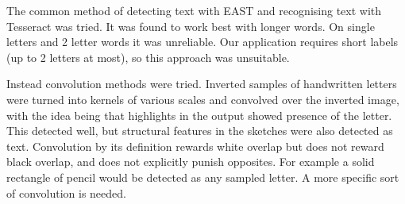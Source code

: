 \documentclass[11pt]{IEEEtran}
\begin{document}
The common method of detecting text with EAST and recognising text with Tesseract was tried. It was found to work best with longer words. On single letters and 2 letter words it was unreliable. Our application requires short labels (up to 2 letters at most), so this approach was unsuitable.

Instead convolution methods were tried. Inverted samples of handwritten letters were turned into kernels of various scales and convolved over the inverted image, with the idea being that highlights in the output showed presence of the letter. This detected well, but structural features in the sketches were also detected as text. Convolution by its definition rewards white overlap but does not reward black overlap, and does not explicitly punish opposites. For example a solid rectangle of pencil would be detected as any sampled letter. A more specific sort of convolution is needed.
\end{document}
